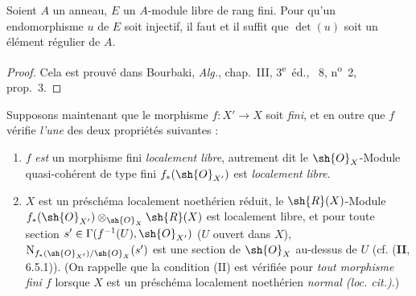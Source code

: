 \begin{lemma}[21.5.2]
\label{IV.21.5.2}
Soient $A$ un anneau, $E$ un $A$-module libre de rang fini.
Pour qu'un endomorphisme $u$ de $E$ soit injectif, il faut et il suffit que $\det(u)$ soit un élément régulier de $A$.
\end{lemma}

\begin{proof}
Cela est prouvé dans Bourbaki, \emph{Alg.}, chap.~III, 3\textsuperscript{e}~éd., \textsection~8, n\textsuperscript{o}~2, prop.~3.
\end{proof}

\begin{env}[21.5.3]
Supposons maintenant que le morphisme $f:X'\to X$ soit \emph{fini}, et en outre que $f$ vérifie \emph{l'une} des deux propriétés suivantes :
\begin{enumerate}[label=\Roman*)]
  \item $f$ \textit{est} un morphisme fini \emph{localement libre}, autrement dit  le $\sh{O}_X$-Module quasi-cohérent de type fini $f_*(\sh{O}_{X'})$ est \emph{localement libre}.
  \item $X$ est un préschéma localement noethérien réduit, le $\sh{R}(X)$-Module $f_*(\sh{O}_{X'})\otimes_{\sh{O}_X}\sh{R}(X)$ est localement libre, et pour toute section $s'\in\Gamma(f^{-1}(U),\sh{O}_{X'})$ ($U$ ouvert
  dans $X$), $\mathrm{N}_{f_*(\sh{O}_{X'})/\sh{O}_X}(s')$ est une section de $\sh{O}_X$ au-dessus de $U$ (cf. (\textbf{II}, 6.5.1)).
  (On rappelle que la condition (II) est vérifiée pour \emph{tout morphisme fini $f$} lorsque $X$ est un préschéma localement noethérien \emph{normal (loc. cit.)}.)
\end{enumerate}


\end{env}
